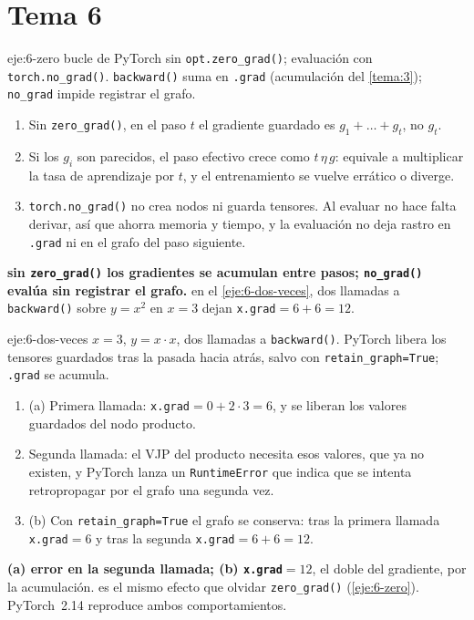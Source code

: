 \section{Tema 6}

\begin{solucion}{eje:6-zero}
\datos bucle de PyTorch sin \texttt{opt.zero\_grad()}; evaluación con \texttt{torch.no\_grad()}.
\planteamiento \texttt{backward()} suma en \texttt{.grad} (acumulación del \cref{tema:3}); \texttt{no\_grad} impide registrar el grafo.
\pasos
\begin{enumerate}[label=\arabic*.]
  \item Sin \texttt{zero\_grad()}, en el paso $t$ el gradiente guardado es $g_1+\dots+g_t$, no $g_t$.
  \item Si los $g_i$ son parecidos, el paso efectivo crece como $t\,\eta\,g$: equivale a multiplicar la tasa de aprendizaje por $t$, y el entrenamiento se vuelve errático o diverge.
  \item \texttt{torch.no\_grad()} no crea nodos ni guarda tensores. Al evaluar no hace falta derivar, así que ahorra memoria y tiempo, y la evaluación no deja rastro en \texttt{.grad} ni en el grafo del paso siguiente.
\end{enumerate}
\resultado \textbf{sin \texttt{zero\_grad()} los gradientes se acumulan entre pasos; \texttt{no\_grad()} evalúa sin registrar el grafo.}
\comprobacion en el \cref{eje:6-dos-veces}, dos llamadas a \texttt{backward()} sobre $y=x^{2}$ en $x=3$ dejan \texttt{x.grad}${}=6+6=12$.
\end{solucion}

\begin{solucion}{eje:6-dos-veces}
\datos $x=3$, $y=x\cdot x$, dos llamadas a \texttt{backward()}.
\planteamiento PyTorch libera los tensores guardados tras la pasada hacia atrás, salvo con \texttt{retain\_graph=True}; \texttt{.grad} se acumula.
\pasos
\begin{enumerate}[label=\arabic*.]
  \item (a) Primera llamada: \texttt{x.grad}${}=0+2\cdot 3=6$, y se liberan los valores guardados del nodo producto.
  \item Segunda llamada: el VJP del producto necesita esos valores, que ya no existen, y PyTorch lanza un \texttt{RuntimeError} que indica que se intenta retropropagar por el grafo una segunda vez.
  \item (b) Con \texttt{retain\_graph=True} el grafo se conserva: tras la primera llamada \texttt{x.grad}${}=6$ y tras la segunda \texttt{x.grad}${}=6+6=12$.
\end{enumerate}
\resultado \textbf{(a) error en la segunda llamada; (b) \texttt{x.grad}${}=12$}, el doble del gradiente, por la acumulación.
\comprobacion es el mismo efecto que olvidar \texttt{zero\_grad()} (\cref{eje:6-zero}). PyTorch~2.14 reproduce ambos comportamientos.
\end{solucion}

